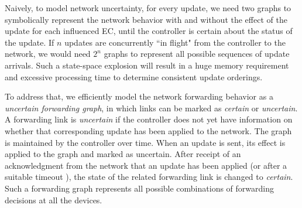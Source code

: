 Naively, to model network uncertainty, for every update, we need two graphs to symbolically represent the network behavior with and without the effect of the update for each influenced EC, until the controller is certain about the status of the update.
If $n$ updates are concurrently ``in flight" from the controller to the network, we would need $2^n$ graphs to represent all possible sequences of update arrivals.
Such a state-space explosion will result in a huge memory requirement and excessive processing time to determine consistent update orderings.

To address that, we efficiently model the network forwarding behavior %
as a \emph{uncertain forwarding graph}, in which links can be marked as {\em certain} or {\em uncertain}.
A forwarding link is {\em uncertain} if the controller does not yet have information on whether 
that corresponding update has been applied to the network.
The graph is maintained by the controller over time. 
When an update is sent, its effect is applied to the graph and marked as uncertain.
After receipt of an acknowledgment from the network that an update has been applied
(or after a suitable timeout%
), the state of the related forwarding link is changed to {\em certain}.
Such a forwarding graph represents all possible combinations
of forwarding decisions at all the devices.

